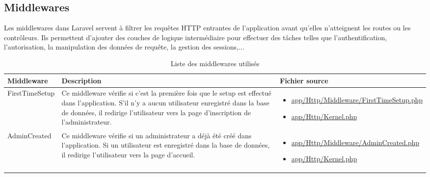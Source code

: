 \newpage
\subsection{Middlewares}

Les middlewares dans Laravel servent à filtrer les requêtes HTTP entrantes de l'application avant qu'elles n'atteignent les routes ou les contrôleurs. Ils permettent d'ajouter des couches de logique intermédiaire pour effectuer des tâches telles que l'authentification, l'autorisation, la manipulation des données de requête, la gestion des sessions,...

\begin{table}[H]
	\begin{adjustbox}{width=\textwidth}
		\begin{tabular}{|l|p{}|p{}|}
			\hline
			\textbf{Middleware} & \textbf{Description} & \textbf{Fichier source} \\
			\hline
			
			FirstTimeSetup & Ce middleware vérifie si c'est la première fois que le setup est effectué dans l'application. S'il n'y a aucun utilisateur enregistré dans la base de données, il redirige l'utilisateur vers la page d'inscription de l'administrateur. & \begin{itemize}
				\item \url{app/Http/Middleware/FirstTimeSetup.php}
				\item \url{app/Http/Kernel.php} 
			\end{itemize} \\
			
			AdminCreated & Ce middleware vérifie si un administrateur a déjà été créé dans l'application. Si un utilisateur est enregistré dans la base de données, il redirige l'utilisateur vers la page d'accueil. & \begin{itemize}
				\item \url{app/Http/Middleware/AdminCreated.php}
				\item \url{app/Http/Kernel.php} 
			\end{itemize} \\
			
			\hline
		\end{tabular}
	\end{adjustbox}
	\caption{Liste des middlewares utilisés}
\end{table}